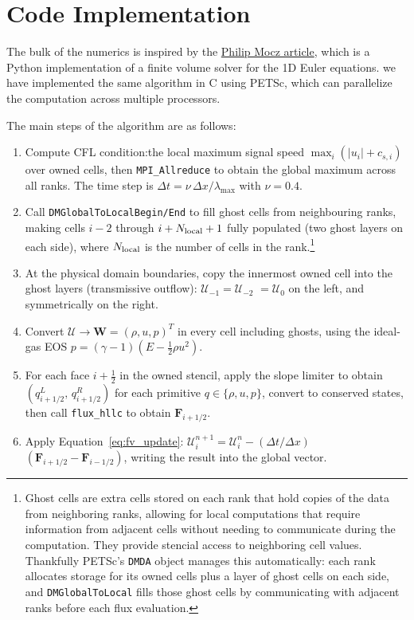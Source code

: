 \documentclass[12pt]{article}
\begin{document}
\section{Code Implementation}
The bulk of the numerics is inspired by the \href{https://github.com/pmocz/riemann-solver/tree/main}{Philip Mocz article}, which is a Python implementation of a finite volume solver for the 1D Euler equations. we have implemented the same algorithm in C using PETSc, which can parallelize the computation across multiple processors.

The main steps of the algorithm are as follows:
\begin{enumerate}
    \item Compute CFL condition:the local maximum signal speed $\max_i(|u_i| + c_{s,i})$ over owned cells, then \texttt{MPI\_Allreduce} to obtain the global maximum across all ranks. The time step is $\Delta t = \nu\,\Delta x / \lambda_{\max}$ with $\nu = 0.4$.

    \item Call \texttt{DMGlobalToLocalBegin/End} to fill ghost cells from neighbouring ranks, making cells $i - 2$ through $i + N_{\rm local} + 1$ fully populated (two ghost layers on each side), where $N_{\rm local}$ is the number of cells in the rank.\footnote{Ghost cells are extra cells stored on each rank that hold copies of the data from neighboring ranks, allowing for local computations that require information from adjacent cells without needing to communicate during the computation. They provide stencial access to neighboring cell values. Thankfully PETSc's \texttt{DMDA} object manages this automatically: each rank allocates storage for its owned cells plus a layer of ghost cells on each side, and \texttt{DMGlobalToLocal} fills those ghost cells by communicating with adjacent ranks before each flux evaluation.}

    \item At the physical domain boundaries, copy the innermost owned cell into the ghost layers (transmissive outflow): $\mathcal{U}_{-1} = \mathcal{U}_{-2}$ $ = \mathcal{U}_0$ on the left, and symmetrically on the right.

    \item  Convert $\mathcal{U} \to \mathbf{W} = (\rho, u, p)^T$ in every cell including ghosts, using the ideal-gas EOS $p = (\gamma-1)(E - \tfrac{1}{2}\rho u^2)$.

    \item For each face $i+\tfrac{1}{2}$ in the owned stencil, apply the slope limiter to obtain $(q^L_{i+1/2},\, q^R_{i+1/2})$ for each primitive $q \in \{\rho, u, p\}$, convert to conserved states, then call \texttt{flux\_hllc} \citep{1994ShWav...4...25T} to obtain $\mathbf{F}_{i+1/2}$.

    \item Apply Equation~\ref{eq:fv_update}: $\mathcal{U}_i^{n+1} = \mathcal{U}_i^n - (\Delta t/\Delta x)$ $(\mathbf{F}_{i+1/2} - \mathbf{F}_{i-1/2})$, writing the result into the global vector.
\end{enumerate}
\end{document}
